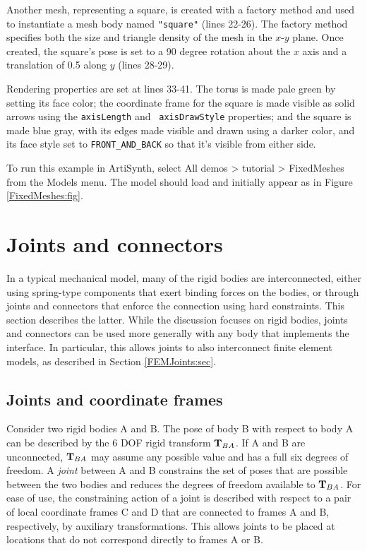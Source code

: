 Another mesh, representing a square, is created with a factory method
and used to instantiate a mesh body named {\tt "square"} (lines
22-26). The factory method specifies both the size and triangle
density of the mesh in the $x$-$y$ plane. Once created, the square's
pose is set to a 90 degree rotation about the $x$ axis and a
translation of 0.5 along $y$ (lines 28-29).

Rendering properties are set at lines 33-41. The torus is made pale
green by setting its face color; the coordinate frame for the square is
made visible as solid arrows using the {\tt axisLength} and {\tt
axisDrawStyle} properties; and the square is made blue gray, with its
edges made visible and drawn using a darker color, and its face style
set to {\tt FRONT\_AND\_BACK} so that it's visible from either side.

To run this example in ArtiSynth, select {\sf All demos > tutorial >
FixedMeshes} from the {\sf Models} menu. The model should load and
initially appear as in Figure \ref{FixedMeshes:fig}.

\section{Joints and connectors}
\label{JointsAndConnectors:sec}

In a typical mechanical model, many of the rigid bodies are
interconnected, either using spring-type components that exert binding
forces on the bodies, or through joints and connectors that enforce
the connection using hard constraints. This section describes the
latter. While the discussion focuses on rigid bodies, joints and
connectors can be used more generally with any body that implements
the 
interface. In particular, this allows joints to also interconnect
finite element models, as described in Section \ref{FEMJoints:sec}.

\subsection{Joints and coordinate frames}
\label{JointsAndFrames:sec}

Consider two rigid bodies A and B. The pose of body B with respect to
body A can be described by the 6 DOF rigid transform ${\bf T}_{BA}$.  If A
and B are unconnected, ${\bf T}_{BA}$ may assume any possible value and has
a full six degrees of freedom. A {\it joint} between A and B
constrains the set of poses that are possible between the two bodies
and reduces the degrees of freedom available to ${\bf T}_{BA}$.  For ease
of use, the constraining action of a joint is described with respect
to a pair of local coordinate frames C and D that are connected to
frames A and B, respectively, by auxiliary transformations.  This
allows joints to be placed at locations that do not correspond
directly to frames A or B.

